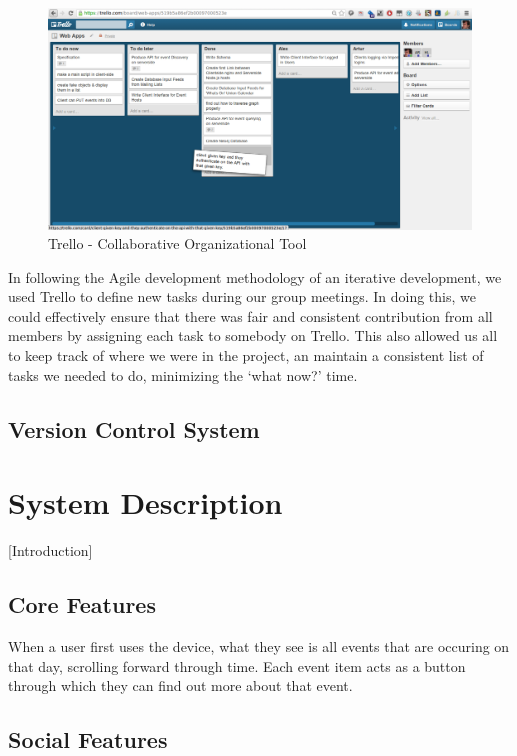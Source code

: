 \documentclass[11pt]{article}
\begin{document}
{\begin{figure}[H]
\centering
\includegraphics[scale=0.35]{trello.png}
\caption{\label{fig:trello} Trello - Collaborative Organizational Tool}
\end{figure}
In following the Agile development methodology of an iterative development, we used Trello to define new tasks during our group meetings. In doing this, we could effectively ensure that there was fair and consistent contribution from all members by assigning each task to somebody on Trello. This also allowed us all to keep track of where we were in the project, an maintain a consistent list of tasks we needed to do, minimizing the `what now?' time.


\subsection {Version Control System}

\section {System Description}

[Introduction]

\subsection {Core Features}

When a user first uses the device, what they see is all events that are occuring on that day, scrolling forward through time. Each event item acts as a button through which they can find out more about that event.

\subsection {Social Features}
}
\end{document}
